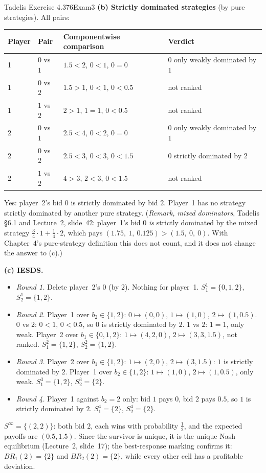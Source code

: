\begin{exsol}{Tadelis Exercise 4.3}{76}{Exam}{3}
\textbf{(b) Strictly dominated strategies} (by pure strategies). All pairs:
\begin{center}\small
\begin{tabular}{llll}
\toprule
Player & Pair & Componentwise comparison & Verdict \\
\midrule
1 & $0$ vs $1$ & $1.5<2$, $0<1$, $0=0$ & $0$ only weakly dominated by $1$ \\
1 & $0$ vs $2$ & $1.5>1$, $0<1$, $0<0.5$ & not ranked \\
1 & $1$ vs $2$ & $2>1$, $1=1$, $0<0.5$ & not ranked \\
2 & $0$ vs $1$ & $2.5<4$, $0<2$, $0=0$ & $0$ only weakly dominated by $1$ \\
2 & $0$ vs $2$ & $2.5<3$, $0<3$, $0<1.5$ & $0$ strictly dominated by $2$ \\
2 & $1$ vs $2$ & $4>3$, $2<3$, $0<1.5$ & not ranked \\
\bottomrule
\end{tabular}
\end{center}
Yes: player~2's bid $0$ is strictly dominated by bid $2$. Player~1 has no strategy strictly
dominated by another pure strategy. (\emph{Remark, mixed dominators}, Tadelis \S6.1 and
Lecture~2, slide~42: player~1's bid $0$ \emph{is} strictly dominated by the mixed strategy
$\tfrac34\cdot 1 + \tfrac14\cdot 2$, which pays $(1.75,\ 1,\ 0.125) > (1.5,\ 0,\ 0)$. With
Chapter~4's pure-strategy definition this does not count, and it does not change the answer to
(c).)

\textbf{(c) IESDS.}
\begin{itemize}
  \item \emph{Round 1.} Delete player~2's $0$ (by $2$). Nothing for player~1.
  $S_1^1 = \{0,1,2\}$, $S_2^1 = \{1,2\}$.
  \item \emph{Round 2.} Player~1 over $b_2 \in \{1,2\}$: $0 \mapsto (0,0)$, $1 \mapsto (1,0)$,
  $2 \mapsto (1, 0.5)$. $0$ vs $2$: $0 < 1$, $0 < 0.5$, so $0$ is strictly dominated by $2$.
  $1$ vs $2$: $1 = 1$, only weak. Player~2 over $b_1 \in \{0,1,2\}$: $1 \mapsto (4,2,0)$,
  $2 \mapsto (3,3,1.5)$, not ranked. $S_1^2 = \{1,2\}$, $S_2^2 = \{1,2\}$.
  \item \emph{Round 3.} Player~2 over $b_1 \in \{1,2\}$: $1 \mapsto (2, 0)$,
  $2 \mapsto (3, 1.5)$: $1$ is strictly dominated by $2$. Player~1 over $b_2 \in \{1,2\}$:
  $1 \mapsto (1,0)$, $2 \mapsto (1,0.5)$, only weak. $S_1^3 = \{1,2\}$, $S_2^3 = \{2\}$.
  \item \emph{Round 4.} Player~1 against $b_2 = 2$ only: bid $1$ pays $0$, bid $2$ pays $0.5$, so
  $1$ is strictly dominated by $2$. $S_1^4 = \{2\}$, $S_2^4 = \{2\}$.
\end{itemize}
$S^\infty = \{(2, 2)\}$: both bid $2$, each wins with probability $\tfrac12$, and the expected
payoffs are $(0.5, 1.5)$. Since the survivor is unique, it is the unique Nash equilibrium
(Lecture~2, slide~17); the best-response marking confirms it: $BR_1(2) = \{2\}$ and
$BR_2(2) = \{2\}$, while every other cell has a profitable deviation.


\end{exsol}
